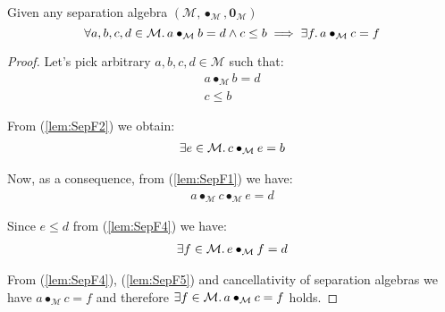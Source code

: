 \lem \label{lem:SepF} Given any separation algebra $(\mathcal{M}, \bullet_\mathcal{M}, \mathbf{0}_\mathcal{M})$
\[
	\forall a, b, c, d \in \mathcal{M} \ldotp a \bullet_\mathcal{M} b = d \land c \leq b \implies \exists f \ldotp a \bullet_\mathcal{M} c = f
\]

{\parindent0pt
\begin{proof}
Let's pick arbitrary $a, b, c, d \in \mathcal{M}$ such that:
\begin{gather}
	\label{lem:SepF1} a \bullet_\mathcal{M} b = d
	\\
	\label{lem:SepF2} c \leq b
\end{gather}

From (\ref{lem:SepF2}) we obtain:
\begin{gather}
	\label{lem:SepF3} \exists e \in \mathcal{M} \ldotp c \bullet_\mathcal{M} e = b
\end{gather}

Now, as a consequence, from (\ref{lem:SepF1}) we have:
\begin{gather}
	\label{lem:SepF4} a \bullet_\mathcal{M} c \bullet_\mathcal{M} e = d
\end{gather}

Since $e \leq d$ from (\ref{lem:SepF4}) we have:
\begin{gather}
	\label{lem:SepF5} \exists f \in \mathcal{M} \ldotp e \bullet_\mathcal{M} f = d
\end{gather}

From (\ref{lem:SepF4}), (\ref{lem:SepF5}) and cancellativity of separation algebras we have $a \bullet_\mathcal{M} c = f$ and therefore $\exists f \in \mathcal{M} \ldotp a \bullet_\mathcal{M} c = f$ holds.
\end{proof}
}